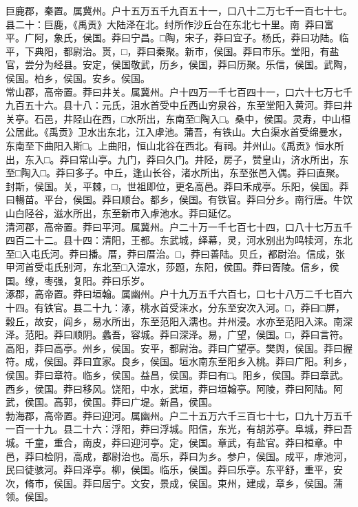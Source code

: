 \documentclass[]{article}
\begin{document}
巨鹿郡，秦置。属冀州。户十五万五千九百五十一，口八十二万七千一百七十七。县二十：巨鹿，《禹贡》大陆泽在北。纣所作沙丘台在东北七十里。南，莽曰富平。广阿，象氏，侯国。莽曰宁昌。□陶，宋子，莽曰宜子。杨氏，莽曰功陆。临平，下典阳，都尉治。贳，□，莽曰秦聚。新市，侯国。莽曰市乐。堂阳，有盐官，尝分为经县。安定，侯国敬武，历乡，侯国，莽曰历聚。乐信，侯国。武陶，侯国。柏乡，侯国。安乡。侯国。\\
常山郡，高帝置。莽曰井关。属冀州。户十四万一千七百四十一，口六十七万七千九百五十六。县十八：元氏，沮水首受中丘西山穷泉谷，东至堂阳入黄河。莽曰井关亭。石邑，井陉山在西，□水所出，东南至□陶入□。桑中，侯国。灵寿，中山桓公居此。《禹贡》卫水出东北，江入虖池。蒲吾，有铁山。大白渠水首受绵曼水，东南至下曲阳入斯□。上曲阳，恒山北谷在西北。有祠。并州山。《禹贡》恒水所出，东入□。莽曰常山亭。九门，莽曰久门。井陉，房子，赞皇山，济水所出，东至□陶入□。莽曰多子。中丘，逢山长谷，渚水所出，东至张邑入偶。莽曰直聚。封斯，侯国。关，平棘，□，世祖即位，更名高邑。莽曰禾成亭。乐阳，侯国。莽曰暢苗。平台，侯国。莽曰顺台。都乡，侯国。有铁官。莽曰分乡。南行唐。牛饮山白陉谷，滋水所出，东至新市入虖池水。莽曰延亿。\\
清河郡，高帝置。莽曰平河。属冀州。户二十万一千七百七十四，口八十七万五千四百二十二。县十四：清阳，王都。东武城，绎幕，灵，河水别出为鸣犊河，东北至□入屯氏河。莽曰播。厝，莽曰厝治。□，莽曰善陆。贝丘，都尉治。信成，张甲河首受屯氏别河，东北至□入漳水，莎题，东阳，侯国。莽曰胥陵。信乡，侯国。缭，枣强，复阳。莽曰乐岁。\\
涿郡，高帝置。莽曰垣翰。属幽州。户十九万五千六百七，口七十八万二千七百六十四。有铁官。县二十九：涿，桃水首受涞水，分东至安次入河。□，莽曰□屏，穀丘，故安，阎乡，易水所出，东至范阳入濡也。并州浸。水亦至范阳入涞。南深泽。范阳。莽曰顺阴。蠡吾，容城。莽曰深泽。易，广望，侯国。□，莽曰言符。高阳，莽曰高亭。州乡，侯国。安平，都尉治。莽曰广望亭。樊舆，侯国。莽曰握符。成，侯国。莽曰宜家。良乡，侯国。垣水南东至阳乡入桃。莽曰广阳。利乡，侯国。莽曰章符。临乡，侯国。益昌，侯国。莽曰有□。阳乡，侯国。莽曰章武。西乡，侯国。莽曰移风。饶阳，中水，武垣，莽曰垣翰亭。阿陵，莽曰阿陆。阿武，侯国。高郭，侯国。莽曰广堤。新昌，侯国。\\
勃海郡，高帝置。莽曰迎河。属幽州。户二十五万六千三百七十七，口九十万五千一百一十九。县二十六：浮阳，莽曰浮城。阳信，东光，有胡苏亭。阜城，莽曰吾城。千童，重合，南皮，莽曰迎河亭。定，侯国。章武，有盐官。莽曰桓章。中邑，莽曰检阴，高成，都尉治也。高乐，莽曰为乡。参户，侯国。成平，虖池河，民曰徒骇河。莽曰泽亭。柳，侯国。临乐，侯国。莽曰乐亭。东平舒，重平，安次，脩市，侯国。莽曰居宁。文安，景成，侯国。束州，建成，章乡，侯国。蒲领。侯国。\\
\end{document}
